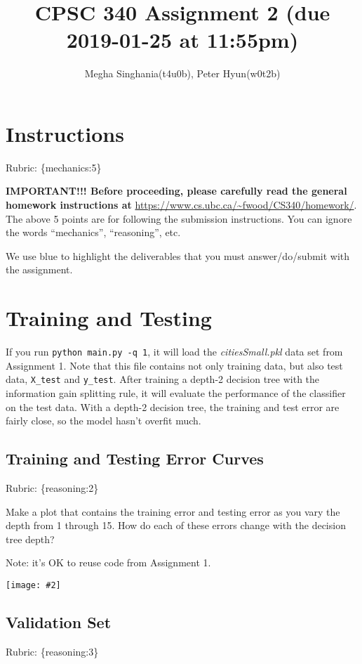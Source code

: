 \documentclass{article}
\def\rubric#1{\gre{Rubric: \{#1\}}}{}
\def\blu#1{{\color{blu}#1}}
\def\gre#1{{\color{gre}#1}}
\newcommand{\centerfig}[2]{\begin{center}\texttt{[image: \#2]}\end{center}}
\begin{document}
\title{CPSC 340 Assignment 2 (due 2019-01-25 at 11:55pm)}
\author{Megha Singhania(t4u0b), Peter Hyun(w0t2b)}
\date{}
\maketitle
\vspace{-4em}

\section*{Instructions}
\rubric{mechanics:5}

\textbf{IMPORTANT!!! Before proceeding, please carefully read the general homework instructions at} \url{https://www.cs.ubc.ca/~fwood/CS340/homework/}. The above 5 points are for following the submission instructions. You can ignore the words ``mechanics'', ``reasoning'', etc.

\vspace{1em}
We use \blu{blue} to highlight the deliverables that you must answer/do/submit with the assignment.

\section{Training and Testing}
If you run \texttt{python main.py \string-q 1}, it will load the \emph{citiesSmall.pkl} data set from Assignment 1.
Note that this file contains not only training data, but also test data, \texttt{X\string_test} and \texttt{y\string_test}.
After training a depth-2 decision tree with the information gain splitting rule, it will evaluate the performance of the classifier on the test data.
With a depth-2 decision tree, the training and test error are fairly close, so the model hasn't overfit much.

\subsection{Training and Testing Error Curves}
\rubric{reasoning:2}

\blu{Make a plot that contains the training error and testing error as you vary the depth from 1 through 15. How do each of these errors change with the decision tree depth?}

Note: it's OK to reuse code from Assignment 1.

\centerfig{.49}{./figs/q1_1_ErrorVsDepth}
\subsection{Validation Set}
\rubric{reasoning:3}
\end{document}
